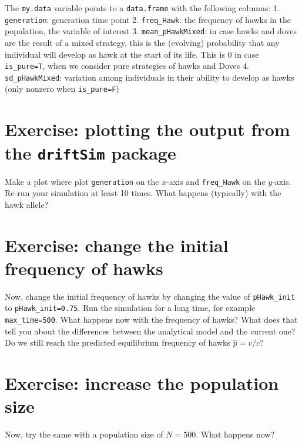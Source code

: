 \documentclass[
]{book}
\begin{document}
The \texttt{my.data} variable points to a \texttt{data.frame} with the following columns:
1. \texttt{generation}: generation time point
2. \texttt{freq\_Hawk}: the frequency of hawks in the population, the variable of interest
3. \texttt{mean\_pHawkMixed}: in case hawks and doves are the result of a mixed strategy, this is the (evolving) probability that any individual will develop as hawk at the start of its life. This is 0 in case \texttt{is\_pure=T}, when we consider pure strategies of hawks and Doves
4. \texttt{sd\_pHawkMixed}: variation among individuals in their ability to develop as hawks (only nonzero when \texttt{is\_pure=F})

\hypertarget{exercise-plotting-the-output-from-the-driftsim-package}{%
\section{\texorpdfstring{Exercise: plotting the output from the \texttt{driftSim} package}{Exercise: plotting the output from the driftSim package}}\label{exercise-plotting-the-output-from-the-driftsim-package}}

Make a plot where plot \texttt{generation} on the \(x\)-axis and \texttt{freq\_Hawk} on the \(y\)-axis. Re-run your simulation at least 10 times. What happens (typically) with the hawk allele?

\hypertarget{exercise-change-the-initial-frequency-of-hawks}{%
\section{Exercise: change the initial frequency of hawks}\label{exercise-change-the-initial-frequency-of-hawks}}

Now, change the initial frequency of hawks by changing the value of \texttt{pHawk\_init} to \texttt{pHawk\_init=0.75}. Run the simulation for a long time, for example \texttt{max\_time=500}. What happens now with the frequency of hawks? What does that tell you about the differences between the analytical model and the current one? Do we still reach the predicted equilibrium frequency of hawks \(\hat{p} = v/c\)?

\hypertarget{exercise-increase-the-population-size}{%
\section{Exercise: increase the population size}\label{exercise-increase-the-population-size}}

Now, try the same with a population size of \(N=500\). What happens now?
\end{document}
